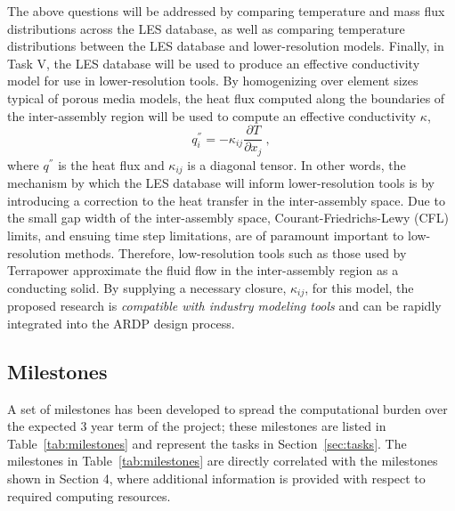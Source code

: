 The above questions will be addressed by comparing temperature and mass flux
distributions across the LES database, as well as comparing temperature
distributions between the LES database and lower-resolution models. Finally, in
Task V, the LES database will be used to produce an effective conductivity
model for use in lower-resolution tools. By homogenizing over element sizes
typical of porous media models, the heat flux computed along the boundaries of
the inter-assembly region will be used to compute an effective conductivity
\(\kappa\),
\begin{equation}
q_i^{''}=-\kappa_{ij}\frac{\partial T}{\partial x_j}\ ,
\end{equation}
where \(q^{''}\) is the heat flux and \(\kappa_{ij}\) is a diagonal tensor. In other words, the mechanism by which the LES database will inform lower-resolution tools is by introducing a correction to the heat transfer in the inter-assembly space. Due to the small gap width of the inter-assembly space, Courant-Friedrichs-Lewy (CFL) limits, and ensuing time step limitations, are of paramount important to low-resolution methods. Therefore, low-resolution tools such as those used by Terrapower \cite{touran} approximate the fluid flow in the inter-assembly region as a conducting solid. By supplying a necessary closure, \(\kappa_{ij}\), for this model, the proposed research is {\it compatible with industry modeling tools} and can be rapidly integrated into the ARDP design process.
\\[2ex]

\vspace{-.25in}
\subsection{Milestones}
\vspace{-.2in}


A set of milestones has been developed to spread the computational burden over
the expected 3 year term of the project; these milestones are listed in Table~\ref{tab:milestones} and represent the tasks
in Section~\ref{sec:tasks}. The milestones in Table~\ref{tab:milestones} are directly correlated
with the milestones shown in Section 4, where additional information is provided with respect
to required computing resources.

